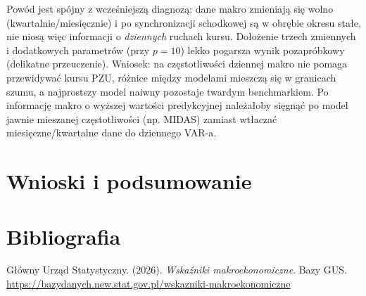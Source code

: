 \documentclass[
  polish,
  letterpaper,
  DIV=11,
  numbers=noendperiod]{scrartcl}
\newlength{\cslhangindent}
\newenvironment{CSLReferences}[2] %
 {\begin{list}{}{%
  \setlength{\itemindent}{0pt}
  \setlength{\leftmargin}{0pt}
  \setlength{\parsep}{0pt}
  \ifodd #1
   \setlength{\leftmargin}{\cslhangindent}
   \setlength{\itemindent}{-1\cslhangindent}
  \fi
  \setlength{\itemsep}{#2\baselineskip}}}
 {\end{list}}
\let\oldlistoffigures\listoffigures
\renewcommand{\listoffigures}{{\rmfamily\oldlistoffigures}}
\renewcommand*\listfigurename{Spis rycin}
\newcommand\listfigurename{Spis rycin}
\begin{document}
Powód jest spójny z wcześniejszą diagnozą: dane makro zmieniają się
wolno (kwartalnie/miesięcznie) i po synchronizacji schodkowej są w
obrębie okresu stałe, nie niosą więc informacji o \emph{dziennych}
ruchach kursu. Dołożenie trzech zmiennych i dodatkowych parametrów (przy
\(p=10\)) lekko pogarsza wynik pozapróbkowy (delikatne przeuczenie).
Wniosek: na częstotliwości dziennej makro nie pomaga przewidywać kursu
PZU, różnice między modelami mieszczą się w granicach szumu, a
najprostszy model naiwny pozostaje twardym benchmarkiem. Po informację
makro o wyższej wartości predykcyjnej należałoby sięgnąć po model jawnie
mieszanej częstotliwości (np. MIDAS) zamiast wtłaczać
miesięczne/kwartalne dane do dziennego VAR-a.

\section{Wnioski i podsumowanie}\label{wnioski-i-podsumowanie}

\section*{Bibliografia}\label{bibliografia}

\protect{}\label{refs}
\begin{CSLReferences}{1}{0}
Główny Urząd Statystyczny. (2026). \emph{Wskaźniki makroekonomiczne}.
Bazy GUS.
\url{https://bazydanych.new.stat.gov.pl/wskazniki-makroekonomiczne}

\end{CSLReferences}

\renewcommand{\listfigurename}{Spis rysunków}
\listoffigures
\end{document}
